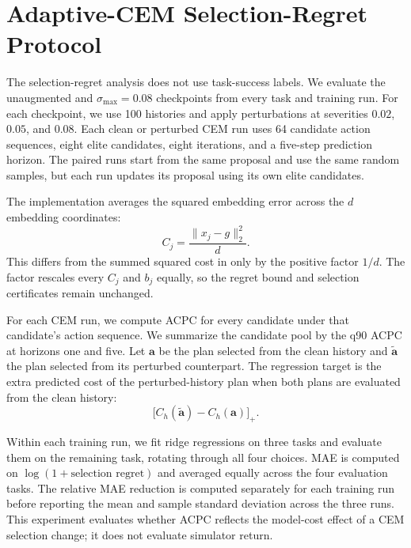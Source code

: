 \documentclass[10pt]{article}
\newcommand{\stdmax}{\ensuremath{\sigma_{\max}}}
\begin{document}
\FloatBarrier
\section{Adaptive-CEM Selection-Regret Protocol}\label{sec:appendix-planner-protocol}

The selection-regret analysis does not use task-success labels. We evaluate
the unaugmented and $\stdmax{}=0.08$ checkpoints from every task and training
run. For each checkpoint, we use 100 histories and apply perturbations at
severities $0.02$, $0.05$, and $0.08$. Each clean or perturbed CEM run uses 64
candidate action sequences, eight elite candidates, eight iterations, and a
five-step prediction horizon. The paired runs start from the same proposal and
use the same random samples, but each run updates its proposal using its own
elite candidates.

The implementation averages the squared embedding error across the $d$
embedding coordinates:
\[
C_j=\frac{\|x_j-g\|_2^2}{d}.
\]
This differs from the summed squared cost in
 only by the positive factor $1/d$. The
factor rescales every $C_j$ and $b_j$ equally, so the regret bound and
selection certificates remain unchanged.

For each CEM run, we compute ACPC for every candidate under that candidate's
action sequence. We summarize the candidate pool by the q90 ACPC at horizons
one and five. Let $\mathbf a$ be the plan selected from the clean history and
$\tilde{\mathbf a}$ the plan selected from its perturbed counterpart. The
regression target is the extra predicted cost of the perturbed-history plan
when both plans are evaluated from the clean history:
\[
\bigl[C_h(\tilde{\mathbf a})-C_h(\mathbf a)\bigr]_+.
\]

Within each training run, we fit ridge regressions on three tasks and evaluate
them on the remaining task, rotating through all four choices. MAE is computed
on $\log(1+\text{selection regret})$ and averaged equally across the four
evaluation tasks. The relative MAE reduction is computed separately for each
training run before reporting the mean and sample standard deviation across
the three runs. This experiment evaluates whether ACPC reflects the model-cost
effect of a CEM selection change; it does not evaluate simulator return.
\end{document}
